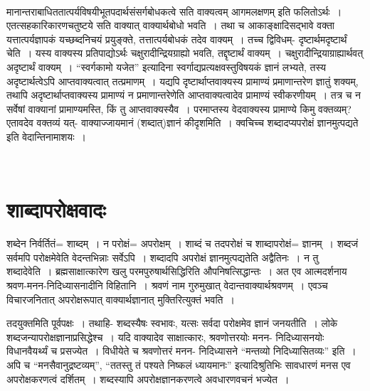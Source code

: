 {~\\[-1.7cm]

मानान्तराबाधिततात्पर्यविषयीभूतपदार्थसंसर्गबोधकत्वे सति वाक्यत्वम् आगमलक्षणम् इति फलितोऽर्थः~। एतत्सहकारिकारणचतुष्टये सति वाक्यात् वाक्यार्थबोधो भवति~। तथा च आकाङ्क्षादिसद्भावे वक्ता यत्तात्पर्यज्ञापकं यच्छब्दनिचयं प्रयुङ्क्ते, तत्तात्पर्यबोधकं तदेव वाक्यम्~। तच्च द्विविधम्- दृष्टार्थमदृष्टार्थं चेति~। यस्य वाक्यस्य प्रतिपाद्योऽर्थः चक्षुरादीन्द्रियग्राह्यो भवति, तद्दृष्टार्थं वाक्यम्~। चक्षुरादीन्द्रियाग्राह्यार्थवत् अदृष्टार्थं वाक्यम्~। “स्वर्गकामो यजेत” इत्यादिना स्वर्गाद्यप्रत्यक्षवस्तुविषयकं ज्ञानं लभ्यते, तस्य अदृष्टार्थत्वेऽपि आप्तवाक्यत्वात् तत्प्रमाणम्~। यद्यपि दृष्टार्थाप्तवाक्यस्य प्रामाण्यं प्रमाणान्तरेण ज्ञातुं शक्यम्, तथापि अदृष्टार्थाप्तवाक्यस्य प्रामाण्यं न प्रमाणान्तरेणेति आप्तवाक्यत्वादेव प्रामाण्यं स्वीकरणीयम्~। तत्र च न सर्वेषां वाक्यानां प्रामाण्यमस्ति, किं तु आप्तवाक्यस्यैव~। परमाप्तस्य वेदवाक्यस्य प्रामाण्ये किमु वक्तव्यम्? एतावदेव वक्तव्यं यत्- वाक्याज्जायमानं (शब्दात्)ज्ञानं कीदृश\-मिति~। क्वचिच्च शब्दादप्यपरोक्षं ज्ञानमुत्पद्यते इति वेदान्तिनामाशयः~। 

~\\[-1.7cm]

\section*{शाब्दापरोक्षवादः}

शब्देन निर्वर्तितं= शाब्दम्~। न परोक्षं= अपरोक्षम्~। शाब्दं च तदपरोक्षं च शाब्दापरोक्षं= ज्ञानम्~। शब्दजं सर्वमपि परोक्षमेवेति वेदन्तभिन्नाः सर्वेऽपि~। शब्दादपि अपरोक्षं ज्ञानमुत्पद्यतेति अद्वैतिनः~। न तु शब्दादेवेति~। ब्रह्मसाक्षात्कारेण खलु परमपुरुषार्थसिद्धिरिति औपनिषत्सिद्धान्तः~। अत एव आत्मदर्शनाय श्रवण-मनन-निदिध्यासनादीनि विहितानि~। श्रवणं नाम गुरुमुखात् वेदान्तवाक्यार्थश्रवणम्~। एवञ्च विचारजनितात् अपरोक्षरूपात् वाक्यार्थज्ञानात् मुक्तिरित्युक्तं भवति~। 

तदयुक्तमिति पूर्वपक्षः~। तथाहि- शब्दस्यैषः स्वभावः, यत्सः सर्वदा परोक्षमेव ज्ञानं जनयतीति~। लोके शब्दजन्यापरोक्षज्ञानाप्रसिद्धेश्च~। यदि वाक्यादेव साक्षात्कारः, श्रवणोत्तरयोः मनन- निदिध्यासनयोः विधानवैयर्थ्यं च प्रसज्येत~। विधीयेते च श्रवणोत्तरं मनन- निदिध्यासने “मन्तव्यो निदिध्यासितव्यः” इति~। अपि च “मनसैवानुद्रष्टव्यम्”, “ततस्तु तं पश्यते निष्कलं ध्यायमानः” इत्यादिश्रुतिभिः सावधारणं मनस एव अपरोक्षकरणत्वं दर्शितम्~। शब्दस्यापि अपरोक्षज्ञानकरणत्वे अवधारणवचनं भज्येत~। 

}
